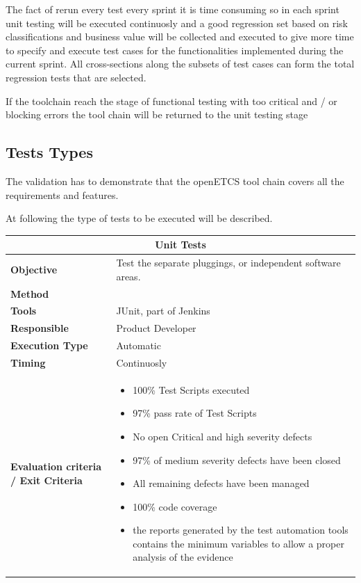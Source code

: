 The fact of rerun every test every sprint it is time consuming so in each sprint unit testing will be executed continuosly and a good regression set based on risk classifications and business value will be collected and executed to give more time to specify and execute test cases for the functionalities implemented during the current sprint. All cross-sections along the subsets of test cases can form the total regression tests that are selected.

If the toolchain reach the stage of functional testing with too critical and / or blocking errors the tool chain will be returned to the unit testing stage

\subsection{Tests Types}
The validation has to demonstrate that the openETCS tool chain covers all the requirements and features.

At following the type of tests to be executed will be described.

\begin{center}
\begin{longtable}[H]{|p{4cm}|p{9cm}|}\hline
\multicolumn{2}{|c|}{\textbf{Unit Tests}}\\\hline
\textbf{Objective} &  Test the separate pluggings, or independent software areas.\\\hline
\textbf{Method} & \\\hline
\textbf{Tools} & JUnit, part of Jenkins\\\hline
\textbf{Responsible} & Product Developer\\\hline
\textbf{Execution Type} & Automatic\\\hline
\textbf{Timing} & Continuosly \\\hline
\textbf{Evaluation criteria / Exit Criteria} & \begin{itemize}
\item 100\% Test Scripts executed
\item 97\% pass rate of Test Scripts
\item No open Critical and high severity defects
\item 97\% of medium severity defects have been closed 
\item All remaining defects have been managed
\item 100\% code coverage
\item the reports generated by the test automation tools contains the minimum variables to allow a proper analysis of the evidence
\end{itemize} \\\hline
\end{longtable}
\end{center}

